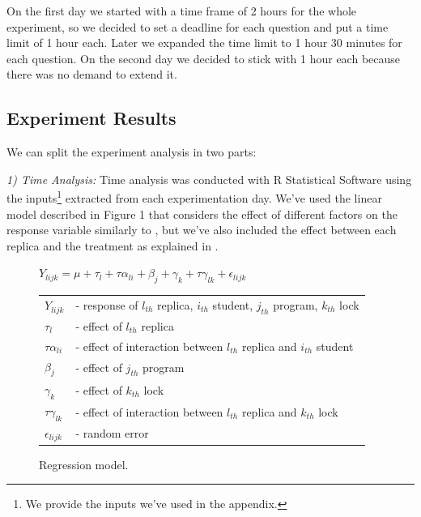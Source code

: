 On the first day we started with a time frame of 2 hours for the whole experiment, so we decided to set a deadline for each question and put a time limit of 1 hour each. Later we expanded the time limit to 1 hour 30 minutes for each question. On the second day we decided to stick with 1 hour each because there was no demand to extend it.

\subsection{Experiment Results}

We can split the experiment analysis in two parts:

\emph{1) Time Analysis:} Time analysis was conducted with R Statistical Software using the inputs\footnote{We provide the inputs we've used in the appendix.} extracted from each experimentation day. We've used the linear model described in Figure 1 that considers the effect of different factors on the response variable similarly to \cite{paola}, but we've also included the effect between each replica and the treatment as explained in \cite{sanchez}.

\begin{figure}
\begin{center}
$Y_{lijk} = \mu + \tau_{l} + \tau\alpha_{li} + \beta_{j} + \gamma_{k} + \tau\gamma_{lk} + \epsilon_{lijk}$\\
\vspace{4mm}
\begin{tabular}{ll}
$Y_{lijk}$ & - response of $l_{th}$ replica, $i_{th}$ student, $j_{th}$ program, $k_{th}$ lock \\
$\tau_{l}$ & - effect of $l_{th}$ replica \\
$\tau\alpha_{li}$ & - effect of interaction between $l_{th}$ replica and $i_{th}$ student \\
$\beta_{j}$ & - effect of $j_{th}$ program \\
$\gamma_{k}$ & - effect of $k_{th}$ lock \\
$\tau\gamma_{lk}$ & - effect of interaction between $l_{th}$ replica and $k_{th}$ lock \\
$\epsilon_{lijk}$ & - random error \\
\end{tabular}
\caption{Regression model.}
\end{center}
\end{figure}


